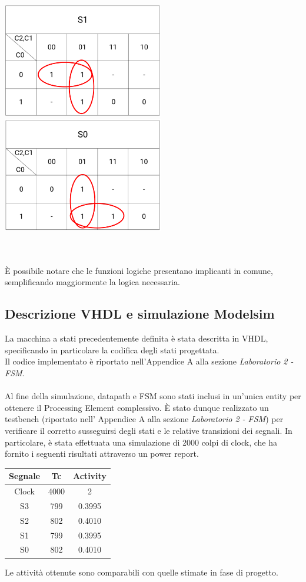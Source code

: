 \documentclass[11pt,  english, makeidx, a4paper, titlepage, oneside]{book}
\begin{document}
\\\\
\centerline{\includegraphics[width=7cm]{./img/Lab_2/K_S1.png}
			\includegraphics[width=7cm]{./img/Lab_2/K_S0.png}}
\\\\
È possibile notare che le funzioni logiche presentano implicanti in comune, semplificando maggiormente la logica necessaria.
\\
\subsection{Descrizione VHDL e simulazione Modelsim}
La macchina a stati precedentemente definita è stata descritta in VHDL, specificando in particolare la codifica degli stati progettata.
\\
Il codice implementato è riportato nell'Appendice A alla sezione \textit{Laboratorio 2 - FSM}.
\\\\
Al fine della simulazione, datapath e FSM sono stati inclusi in un'unica entity per ottenere il Processing Element complessivo. È stato dunque realizzato un testbench (riportato nell' Appendice A alla sezione \textit{Laboratorio 2 - FSM}) per verificare il corretto susseguirsi degli stati e le relative transizioni dei segnali.
In particolare, è stata effettuata una simulazione di 2000 colpi di clock, che ha fornito i seguenti risultati attraverso un power report.
\\
\begin{center}
	\begin{tabular}{|c|c|c|}
	\hline
	Segnale & Tc & Activity \\ 
	\hline
	Clock & 4000 & 2 \\
	\hline
	S3 & 799 & 0.3995 \\
	\hline
	S2 & 802 & 0.4010 \\
	\hline
	S1 & 799 & 0.3995 \\
	\hline
	S0 & 802 & 0.4010 \\
	\hline
	\end{tabular}	
\end{center}
\vspace{0.3cm}  
Le attività ottenute sono comparabili con quelle stimate in fase di progetto.  
\\
\end{document}
